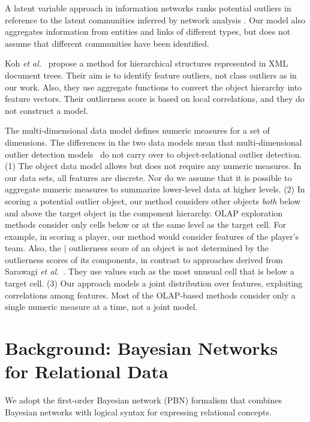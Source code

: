 {				A latent variable approach in information networks ranks potential outliers in reference to the latent communities inferred by network analysis \citep{Gao2010}. Our model also aggregates information from entities and links of different types, but does not assume that different communities have been identified. 
				
				
				Koh {\em et al.}~\citep{Koh2008} propose a method for hierarchical structures represented in XML document trees. Their aim is to identify feature outliers, not class outliers as in our work. Also, they use aggregate functions to convert the object hierarchy into feature vectors. Their outlierness score is based on local correlations, and they do not construct a model.
				
				
				The multi-dimensional data model defines numeric measures for a set of dimensions. 
				The differences in the two data models mean that multi-dimensional outlier detection models~\citep{Sarawagi1998} do not carry over to object-relational outlier detection. (1) The object data model allows but does not require any numeric measures. In our data sets, all features are discrete. Nor do we assume that it is possible to aggregate numeric measures to summarize lower-level data at higher levels.  
				(2) In scoring a potential outlier object, our method considers other objects {\em both} below and above the target object in the component hierarchy. OLAP exploration methods consider only cells below or at the same level as the target cell. For example, in scoring a player, our method would consider features of the player's team.  
				Also, the $\mid$ outlierness score of an object is not determined by the outlierness scores of its components, in contrast to approaches derived from Sarawagi {\em et al.}~\citep{Sarawagi1998}. They use values such as the most unusual cell that is below a target cell.
				(3) Our approach models a joint distribution over features, exploiting correlations among features. Most of the OLAP-based methods consider only a single numeric measure at a time, not a joint model.  




\section{Background: Bayesian Networks for Relational Data}
We adopt  
the first-order Bayesian network (PBN) formalism \citep{Poole2003} that combines Bayesian networks with logical syntax for expressing relational concepts. 


}
